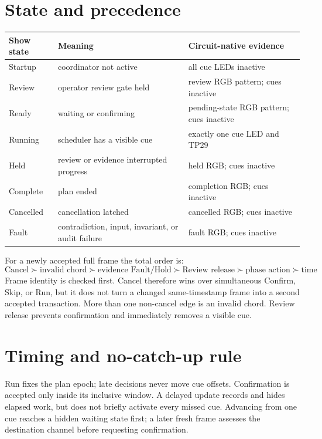 \documentclass[11pt]{article}
\begin{document}
\section{State and precedence}

\begin{tabularx}{\linewidth}{@{}l X X@{}}
\toprule
Show state & Meaning & Circuit-native evidence\\
\midrule
Startup & coordinator not active & all cue LEDs inactive\\
Review & operator review gate held & review RGB pattern; cues inactive\\
Ready & waiting or confirming & pending-state RGB pattern; cues inactive\\
Running & scheduler has a visible cue & exactly one cue LED and TP29\\
Held & review or evidence interrupted progress & held RGB; cues inactive\\
Complete & plan ended & completion RGB; cues inactive\\
Cancelled & cancellation latched & cancelled RGB; cues inactive\\
Fault & contradiction, input, invariant, or audit failure & fault RGB; cues inactive\\
\bottomrule
\end{tabularx}

For a newly accepted full frame the total order is:
\[
\boxed{\text{Cancel}\succ\text{invalid chord}\succ
\text{evidence Fault/Hold}\succ\text{Review release}\succ
\text{phase action}\succ\text{time}}
\]
Frame identity is checked first. Cancel therefore wins over simultaneous
Confirm, Skip, or Run, but it does not turn a changed same-timestamp frame into
a second accepted transaction. More than one non-cancel edge is an invalid
chord. Review release prevents confirmation and immediately removes a visible
cue.

\section{Timing and no-catch-up rule}

Run fixes the plan epoch; late decisions never move cue offsets. Confirmation
is accepted only inside its inclusive window. A delayed update records and
hides elapsed work, but does not briefly activate every missed cue. Advancing
from one cue reaches a hidden waiting state first; a later fresh frame assesses
the destination channel before requesting confirmation.
\end{document}
